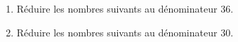 \begin{exercice*}
    \begin{enumerate}
        \item Réduire les nombres suivants au dénominateur \num{36}.
        \begin{multicols}{2}            
            \begin{enumerate}
            \end{enumerate}
        \end{multicols}
        \item Réduire les nombres suivants au dénominateur \num{30}.
        \begin{multicols}{2}            
            \begin{enumerate}
            \end{enumerate}
        \end{multicols}
    \end{enumerate}
\end{exercice*}

